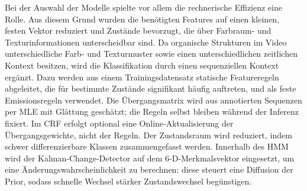 Bei der Auswahl der Modelle spielte vor allem die rechnerische Effizienz eine Rolle. Aus diesem Grund wurden die benötigten Features auf einen kleinen, festen Vektor reduziert und Zustände bevorzugt, die über Farbraum‑ und Texturinformationen unterscheidbar sind. Da organische Strukturen im Video unterschiedliche Farb‑ und Texturmuster sowie einen unterschiedlichen zeitlichen Kontext besitzen, wird die Klassifikation durch einen sequenziellen Kontext ergänzt. Dazu werden aus einem Trainingsdatensatz statische Featureregeln abgeleitet, die für bestimmte Zustände signifikant häufig auftreten, und als feste Emissionsregeln verwendet. Die Übergangsmatrix wird aus annotierten Sequenzen per MLE mit Glättung geschätzt; die Regeln selbst bleiben während der Inferenz fixiert. Im CRF erfolgt optional eine Online‑Aktualisierung der Übergangsgewichte, nicht der Regeln. Der Zustandsraum wird reduziert, indem schwer differenzierbare Klassen zusammengefasst werden. Innerhalb des HMM wird der Kalman‑Change‑Detector auf dem 6‑D‑Merkmalsvektor eingesetzt, um eine Änderungswahrscheinlichkeit zu berechnen; diese steuert eine Diffusion der Prior, sodass schnelle Wechsel stärker Zustandswechsel begünstigen.
